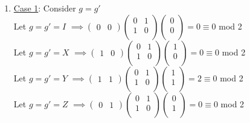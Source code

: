 \documentclass[a4paper,12pt]{article}
\begin{document}
\begin{enumerate}[label=(\alph*)]
\item \underline{Case 1}: Consider $g=g'$ \\
Let $g=g'=I$ \hspace{1.7mm}$\implies \begin{pmatrix}
    0 & 0
\end{pmatrix}\begin{pmatrix}
    0 & 1 \\
    1 & 0 \\
\end{pmatrix}\begin{pmatrix}
    0 \\
    0 \\
\end{pmatrix} = 0 \equiv 0$ mod 2 \\
Let $g=g'=X$ $\implies \begin{pmatrix}
    1 & 0 
\end{pmatrix}\begin{pmatrix}
    0 & 1\\
    1 & 0\\
\end{pmatrix}\begin{pmatrix}
    1 \\
    0 \\
\end{pmatrix} = 0 \equiv 0$ mod 2 \\
Let $g=g'=Y$ $\implies \begin{pmatrix}
    1 & 1 
\end{pmatrix}\begin{pmatrix}
    0 & 1 \\
    1 & 0 \\
\end{pmatrix}\begin{pmatrix}
    1 \\
    1 \\
\end{pmatrix} = 2 \equiv 0$ mod 2 \\
Let $g=g'=Z$ $\implies \begin{pmatrix}
    0 & 1 
\end{pmatrix}\begin{pmatrix}
    0 & 1 \\
    1 & 0 \\
\end{pmatrix}\begin{pmatrix}
    0 \\
    1 \\
\end{pmatrix}= 0 \equiv 0$ mod 2 \pagebreak \\

\end{enumerate}
\end{document}
